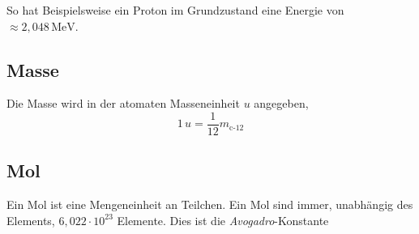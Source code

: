 \documentclass{article}
\begin{document}
So hat Beispielsweise ein Proton im Grundzustand eine Energie von $\approx 2,048\,\text{MeV}$.
 
\subsection{Masse}
Die Masse wird in der atomaten Masseneinheit $u$ angegeben,
\[
 1\,u = \frac{1}{12} m_{\text{c-}12} 
\] 
 
\subsection{Mol} 
Ein Mol ist eine Mengeneinheit an Teilchen. Ein Mol sind immer, unabhängig des Elements, $6,022 \cdot 10^{23}$ Elemente. Dies ist die \emph{Avogadro}-Konstante 
 
\end{document}

